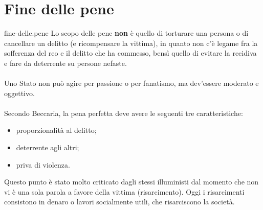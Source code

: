 \documentclass[preview]{standalone}
\begin{document}
\genpage

\section{Fine delle pene}

\begin{snippet}{fine-delle.pene}
    Lo scopo delle pene \textbf{non} è
    quello di torturare una persona o di cancellare un delitto
    (e ricompensare la vittima), in quanto non c'è legame fra la sofferenza
    del reo e il delitto che ha commesso, bensì quello di
    evitare la recidiva e fare da deterrente su persone nefaste.
    \\\\
    Uno Stato non può agire per passione o per fanatismo, ma dev'essere moderato
    e oggettivo.
    \\\\
    Secondo Beccaria, la pena perfetta deve avere le seguenti tre caratteristiche:
    \begin{itemize}
        \item proporzionalità al delitto;
        \item deterrente agli altri;
        \item priva di violenza.
    \end{itemize}
    Questo punto è stato molto criticato dagli stessi illuministi
    dal momento che non vi è una sola parola a favore della vittima (risarcimento).
    Oggi i risarcimenti consistono in denaro o lavori socialmente utili, che risarciscono
    la società.
    
\end{snippet}
\end{document}
